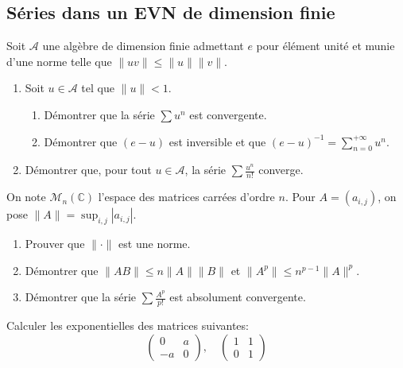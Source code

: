 \subsection{Séries dans un EVN de dimension finie}

\begin{exercice}
Soit $\mathcal{A}$ une algèbre de dimension finie admettant $e$ pour élément unité et munie d'une norme telle que $\|uv\| \le \|u\|\|v\|$.
\begin{enumerate}
    \item Soit $u \in \mathcal{A}$ tel que $\|u\| < 1$.
    \begin{enumerate}
        \item Démontrer que la série $\sum u^{n}$ est convergente.
        \item Démontrer que $(e-u)$ est inversible et que $(e-u)^{-1}=\sum_{n=0}^{+\infty}u^{n}$.
    \end{enumerate}
    \item Démontrer que, pour tout $u \in \mathcal{A}$, la série $\sum\frac{u^{n}}{n!}$ converge.
\end{enumerate}
\end{exercice}

\begin{exercice}
On note $\mathcal{M}_{n}(\mathbb{C})$ l'espace des matrices carrées d'ordre $n$. Pour $A=(a_{i,j})$, on pose $\|A\| = \sup_{i,j} |a_{i,j}|$.
\begin{enumerate}
    \item Prouver que $\|\cdot\|$ est une norme.
    \item Démontrer que $\|AB\| \le n\|A\|\|B\|$ et $\|A^p\| \le n^{p-1}\|A\|^p$.
    \item Démontrer que la série $\sum\frac{A^{p}}{p!}$ est absolument convergente.
\end{enumerate}
\end{exercice}

\begin{exercice}
Calculer les exponentielles des matrices suivantes:
$$ \begin{pmatrix} 0 & a \\ -a & 0 \end{pmatrix}, \quad \begin{pmatrix} 1 & 1 \\ 0 & 1 \end{pmatrix} $$

\end{exercice}

